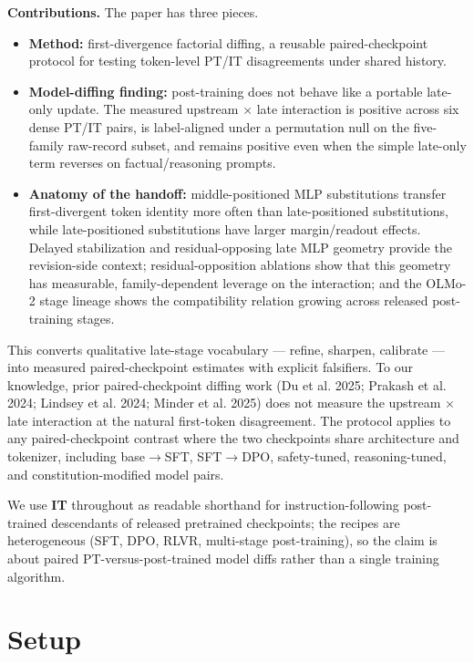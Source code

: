 \documentclass[11pt]{article}
\begin{document}
\textbf{Contributions.} The paper has three pieces.

\begin{itemize}
\item \textbf{Method:} first-divergence factorial diffing, a reusable paired-checkpoint protocol for testing token-level PT/IT disagreements under shared history.
\item \textbf{Model-diffing finding:} post-training does not behave like a portable late-only update. The measured upstream \ensuremath{\times} late interaction is positive across six dense PT/IT pairs, is label-aligned under a permutation null on the five-family raw-record subset, and remains positive even when the simple late-only term reverses on factual/reasoning prompts.
\item \textbf{Anatomy of the handoff:} middle-positioned MLP substitutions transfer first-divergent token identity more often than late-positioned substitutions, while late-positioned substitutions have larger margin/readout effects. Delayed stabilization and residual-opposing late MLP geometry provide the revision-side context; residual-opposition ablations show that this geometry has measurable, family-dependent leverage on the interaction; and the OLMo-2 stage lineage shows the compatibility relation growing across released post-training stages.
\end{itemize}

This converts qualitative late-stage vocabulary --- refine, sharpen, calibrate --- into measured paired-checkpoint estimates with explicit falsifiers. To our knowledge, prior paired-checkpoint diffing work (Du et al. 2025; Prakash et al. 2024; Lindsey et al. 2024; Minder et al. 2025) does not measure the upstream \ensuremath{\times} late interaction at the natural first-token disagreement. The protocol applies to any paired-checkpoint contrast where the two checkpoints share architecture and tokenizer, including base\ensuremath{\to}SFT, SFT\ensuremath{\to}DPO, safety-tuned, reasoning-tuned, and constitution-modified model pairs.

We use \textbf{IT} throughout as readable shorthand for instruction-following post-trained descendants of released pretrained checkpoints; the recipes are heterogeneous (SFT, DPO, RLVR, multi-stage post-training), so the claim is about paired PT-versus-post-trained model diffs rather than a single training algorithm.


\section{Setup}
\end{document}
